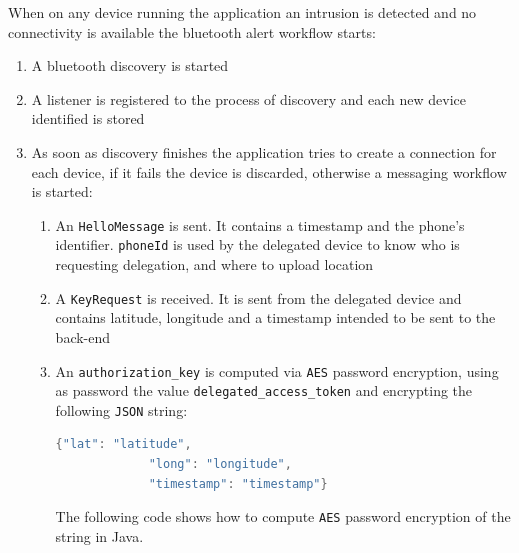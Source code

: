 \documentclass[conference, 11pt]{IEEEtran}
\begin{document}
When on any device running the application an intrusion is detected and no connectivity is available the bluetooth alert workflow starts:\\
\begin{enumerate}
	\item A bluetooth discovery is started
	\item A listener is registered to the process of discovery and each new device identified is stored
	\item As soon as discovery finishes the application tries to create a connection for each device, if it fails the device is discarded, otherwise a messaging workflow is started:
		\begin{enumerate}

			\item An \texttt{HelloMessage} is sent. It contains a timestamp and the phone's identifier. \texttt{phoneId} is used by the delegated device to know who is requesting delegation, and where to upload location
			\item A \texttt{KeyRequest} is received. It is sent from the delegated device and contains latitude, longitude and a timestamp intended to be sent to the back-end
			\item An \texttt{authorization\_key} is computed via \texttt{AES} password encryption, using as password the value \texttt{delegated\_access\_token} and encrypting the following \texttt{JSON} string:

			\begin{lstlisting}[language=Java, caption=JSON encrypted with AES]
			{"lat": "latitude",
			 "long": "longitude",
			 "timestamp": "timestamp"}
			\end{lstlisting}

			The following code shows how to compute \texttt{AES} password encryption of the string in Java.


\end{enumerate}
\end{enumerate}
\end{document}
